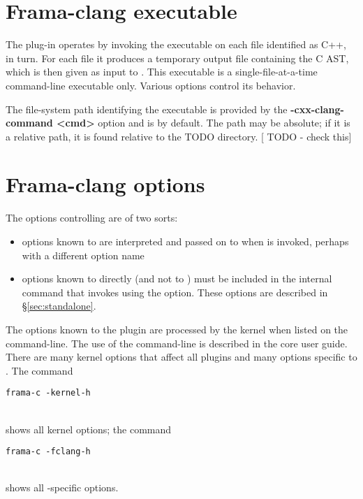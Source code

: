 \section{Frama-clang executable}
The plug-in operates by invoking the executable \irg
on each file identified as C++, in turn. 
For each file it produces a temporary output file containing the C AST, which is then given as input to \framac. 
This executable is a single-file-at-a-time command-line executable only. 
Various options control its behavior.

The file-system path identifying the executable is provided by the \textbf{-cxx-clang-command <cmd>}
option and is \irg by default. The path may be absolute; if it is a relative path, it is found relative to the TODO directory. [ TODO - check this]


\section{Frama-clang options}

The options controlling \fclang are of two sorts:
\begin{itemize}
\item options known to \framac are interpreted and passed on to \fclang when
\irg is invoked, perhaps with a different option name
\item options known to \fclang directly (and not to \framac) must be 
included in the internal command that invokes \irg using the  option. These options are described in \S\ref{sec:standalone}.
\end{itemize}

The options known to the \fcl plugin are processed by the \fc kernel when listed on the \fc command-line. 
The use of the \fc command-line is described in the core \fc 
user guide.
There are many kernel options that affect all plugins and many options specific to \fclang.
The command \\
\centerline{\lstinline|frama-c -kernel-h|} \\
shows all kernel options; the command\\
\centerline{\lstinline|frama-c -fclang-h|} \\
shows all \fcl-specific options.

